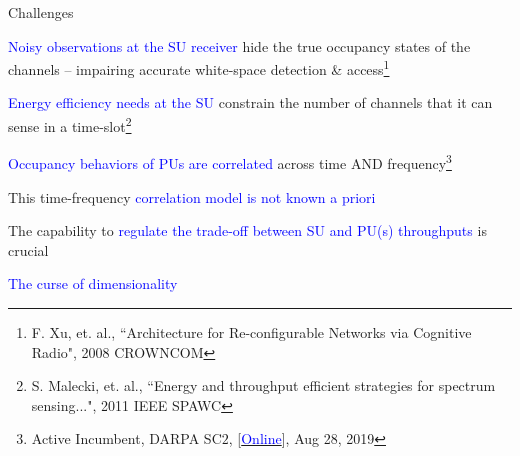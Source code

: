 \documentclass{beamer}
\begin{document}
\begin{frame}{Challenges}
    \begin{itemize}
        \footnotesize{
        \item \textcolor{blue}{Noisy observations at the SU receiver} hide the true occupancy states of the channels -- impairing accurate white-space detection \& access\footnote{\tiny{F. Xu, et. al., ``Architecture for Re-configurable Networks via Cognitive Radio", 2008 CROWNCOM}}
        \item \textcolor{blue}{Energy efficiency needs at the SU} constrain the number of channels that it can sense in a time-slot\footnote{\tiny{S. Malecki, et. al., ``Energy and throughput efficient strategies for spectrum sensing...", 2011 IEEE SPAWC}}
        \item \textcolor{blue}{Occupancy behaviors of PUs are correlated} across time AND frequency\footnote{\tiny{Active Incumbent, DARPA SC$2$, [\href{https://sc2colosseum.freshdesk.com/support/solutions/articles/22000239489-active-incumbent-}{\textcolor{blue}{Online}}], Aug 28, 2019}}
        \item This time-frequency \textcolor{blue}{correlation model is not known a priori}
        \item The capability to \textcolor{blue}{regulate the trade-off between SU and PU(s) throughputs} is crucial
        \item \textcolor{blue}{The curse of dimensionality}}
    \end{itemize}
\end{frame}
\end{document}
